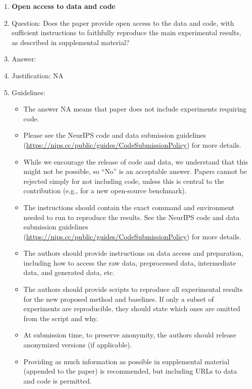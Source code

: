 \documentclass{article}
\begin{document}
\begin{enumerate}
\item {\bf Open access to data and code}
    \item[] Question: Does the paper provide open access to the data and code, with sufficient instructions to faithfully reproduce the main experimental results, as described in supplemental material?
    \item[] Answer: \answerNo{} %
    \item[] Justification: NA
    \item[] Guidelines:
    \begin{itemize}
        \item The answer NA means that paper does not include experiments requiring code.
        \item Please see the NeurIPS code and data submission guidelines (\url{https://nips.cc/public/guides/CodeSubmissionPolicy}) for more details.
        \item While we encourage the release of code and data, we understand that this might not be possible, so “No” is an acceptable answer. Papers cannot be rejected simply for not including code, unless this is central to the contribution (e.g., for a new open-source benchmark).
        \item The instructions should contain the exact command and environment needed to run to reproduce the results. See the NeurIPS code and data submission guidelines (\url{https://nips.cc/public/guides/CodeSubmissionPolicy}) for more details.
        \item The authors should provide instructions on data access and preparation, including how to access the raw data, preprocessed data, intermediate data, and generated data, etc.
        \item The authors should provide scripts to reproduce all experimental results for the new proposed method and baselines. If only a subset of experiments are reproducible, they should state which ones are omitted from the script and why.
        \item At submission time, to preserve anonymity, the authors should release anonymized versions (if applicable).
        \item Providing as much information as possible in supplemental material (appended to the paper) is recommended, but including URLs to data and code is permitted.
    \end{itemize}



\end{enumerate}
\end{document}
